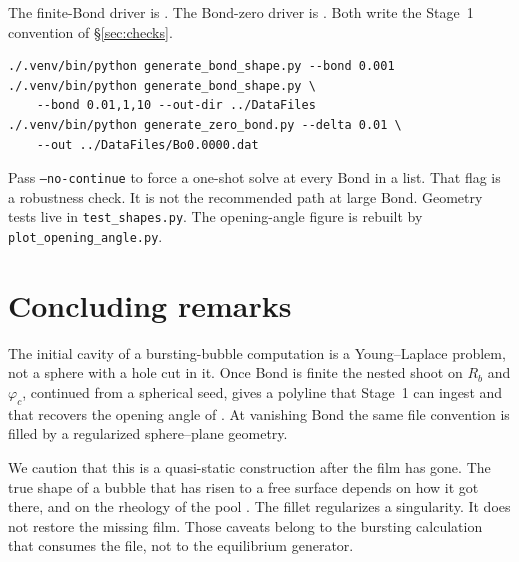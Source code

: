 \documentclass[11pt,a4paper]{article}
\newcommand{\Rb}{R_b}
\begin{document}
The finite-Bond driver is .
The Bond-zero driver is .
Both write the Stage~1 convention of \S\ref{sec:checks}.

\begin{verbatim}
./.venv/bin/python generate_bond_shape.py --bond 0.001
./.venv/bin/python generate_bond_shape.py \
    --bond 0.01,1,10 --out-dir ../DataFiles
./.venv/bin/python generate_zero_bond.py --delta 0.01 \
    --out ../DataFiles/Bo0.0000.dat
\end{verbatim}

Pass \texttt{--no-continue} to force a one-shot solve at every Bond in
a list. That flag is a robustness check. It is not the recommended
path at large Bond. Geometry tests live in \texttt{test\_shapes.py}.
The opening-angle figure is rebuilt by
\texttt{plot\_opening\_angle.py}.

\section{Concluding remarks}
\label{sec:close}

The initial cavity of a bursting-bubble computation is a Young--Laplace
problem, not a sphere with a hole cut in it. Once Bond is finite the
nested shoot on $\Rb$ and $\varphi_c$, continued from a spherical seed,
gives a polyline that Stage~1 can ingest and that recovers the opening
angle of \citet{Lhuissier2012}. At vanishing Bond the same file
convention is filled by a regularized sphere--plane geometry.

We caution that this is a quasi-static construction after the film has
gone. The true shape of a bubble that has risen to a free surface
depends on how it got there, and on the rheology of the pool
\citep{Sanjay2021}. The fillet regularizes a singularity. It does not
restore the missing film. Those caveats belong to the bursting
calculation that consumes the file, not to the equilibrium generator.



\end{document}
